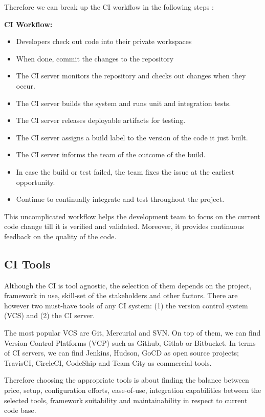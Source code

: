 Therefore we can break up the CI workflow in the following steps \citep{Fowler2006}:

\textbf{CI Workflow:}

\begin{itemize}
\item Developers check out code into their private workspaces
\item When done, commit the changes to the repository
\item The CI server monitors the repository and checks out changes when they occur.
\item The CI server builds the system and runs unit and integration tests.
\item The CI server releases deployable artifacts for testing.
\item The CI server assigns a build label to the version of the code it just built.
\item The CI server informs the team of the outcome of the build.
\item In case the build or test failed, the team fixes the issue at the earliest opportunity.
\item Continue to continually integrate and test throughout the project.
\end{itemize}

This uncomplicated workflow helps the development team to focus on the current code change till it is verified and validated. Moreover, it provides continuous feedback on the quality of the code.

\subsection{CI Tools}

Although the CI is tool agnostic, the selection of them depends on the project, framework in use, skill-set of the stakeholders and other factors. There are however two must-have tools of any CI system: (1) the version control system (VCS) and (2) the CI server.

The most popular VCS are Git, Mercurial and SVN. On top of them, we can find Version Control Platforms (VCP) such as Github, Gitlab or Bitbucket. In terms of CI servers, we can find Jenkins, Hudson, GoCD as open source projects; TravisCI, CircleCI, CodeShip and Team City as commercial tools.

Therefore choosing the appropriate tools is about finding the balance between price, setup, configuration efforts, ease-of-use, integration capabilities between the selected tools, framework suitability and maintainability in respect to current code base.

